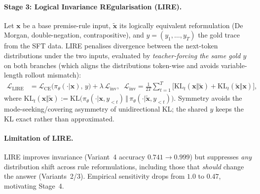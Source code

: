 \documentclass{article}
\begin{document}
\paragraph{Stage 3: Logical Invariance REgularisation (LIRE).}
Let $\mathbf{x}$ be a base premise-rule input, $\tilde{\mathbf{x}}$ its logically equivalent reformulation (De Morgan, double-negation, contrapositive), and $y=(y_1,\dots,y_T)$ the gold trace from the SFT data. LIRE penalises divergence between the next-token distributions under the two inputs, evaluated by \emph{teacher-forcing the same gold $y$} on both branches (which aligns the distributions token-wise and avoids variable-length rollout mismatch):
\begin{align}
\mathcal{L}_{\mathrm{LIRE}} &= \mathcal{L}_{\mathrm{CE}}\bigl(\pi_\theta(\cdot|\mathbf{x}),\, y\bigr) + \lambda\,\mathcal{L}_{\mathrm{inv}},\;\;
\mathcal{L}_{\mathrm{inv}} = \tfrac{1}{2 T}\!\sum_{t=1}^{T} \bigl[\mathrm{KL}_t(\mathbf{x}\Vert\tilde{\mathbf{x}}) + \mathrm{KL}_t(\tilde{\mathbf{x}}\Vert\mathbf{x})\bigr],
\label{eq:lire}
\end{align}
where $\mathrm{KL}_t(\mathbf{x}\Vert\tilde{\mathbf{x}}) := \mathrm{KL}\bigl(\pi_\theta(\cdot|\mathbf{x},y_{<t})\,\Vert\,\pi_\theta(\cdot|\tilde{\mathbf{x}},y_{<t})\bigr)$. Symmetry avoids the mode-seeking/covering asymmetry of unidirectional KL; the shared $y$ keeps the KL exact rather than approximated.

\paragraph{Limitation of LIRE.}
LIRE improves invariance (Variant~4 accuracy $0.741 \to 0.999$) but suppresses \emph{any} distribution shift across rule reformulations, including those that \emph{should} change the answer (Variants~2/3). Empirical sensitivity drops from $1.0$ to $0.47$, motivating Stage~4.
\end{document}
